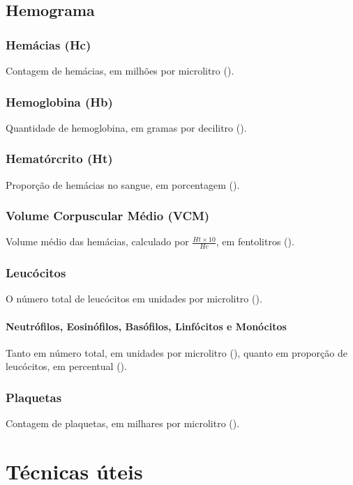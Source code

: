 \documentclass{book}
\begin{document}
\section{Hemograma}

\subsection{Hemácias (Hc)}
Contagem de hemácias, em milhões por microlitro ().

\subsection{Hemoglobina (Hb)}
Quantidade de hemoglobina, em gramas por decilitro (\per{\gram}{\deciliter}).

\subsection{Hematórcrito (Ht)}
Proporção de hemácias no sangue, em porcentagem (\percent).

\subsection{Volume Corpuscular Médio (VCM)}
Volume médio das hemácias, calculado por \(\frac{Ht \times 10}{Hc}\), em fentolitros (\femtoliter).

\subsection{Leucócitos}
O número total de leucócitos em unidades por microlitro (\per{}{\microliter}).

\subsubsection{Neutrófilos, Eosinófilos, Basófilos, Linfócitos e Monócitos}
Tanto em número total, em unidades por microlitro (\per{}{\microliter}), quanto em proporção de leucócitos, em percentual (\percent).

\subsection{Plaquetas}
Contagem de plaquetas, em milhares por microlitro ().

\chapter{Técnicas úteis}
\end{document}
